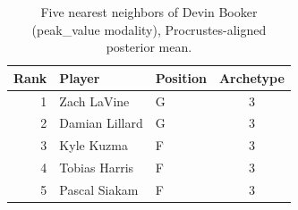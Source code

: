 \begin{table}[htbp]
  \centering\small
  \begin{tabular}{rllc}
    \toprule
    Rank & Player & Position & Archetype \\
    \midrule
    1 & Zach LaVine & G & 3 \\
    2 & Damian Lillard & G & 3 \\
    3 & Kyle Kuzma & F & 3 \\
    4 & Tobias Harris & F & 3 \\
    5 & Pascal Siakam & F & 3 \\
    \bottomrule
  \end{tabular}
  \caption{Five nearest neighbors of Devin Booker (peak_value modality), Procrustes-aligned posterior mean.}
  \label{tab:Devin_Booker_neighbors_peak_value}
\end{table}

